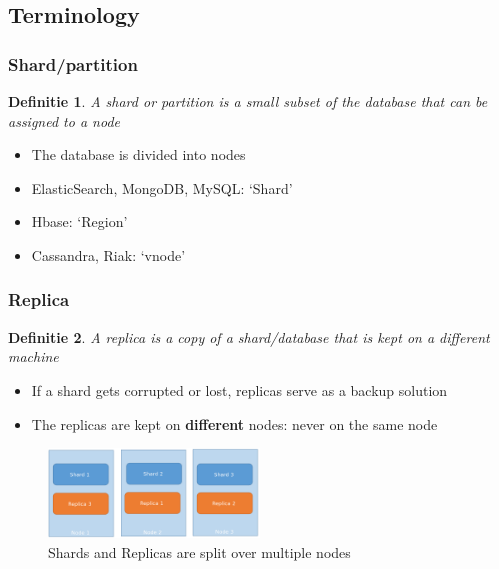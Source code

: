 \documentclass{article}
\newtheorem{theorem}{Definitie}[section]
\begin{document}
\subsection{Terminology}

\subsubsection{Shard/partition}

\begin{theorem}
    A shard or partition is a small subset of the database that can be assigned to a node
\end{theorem}

\begin{itemize}
    \item The database is divided into nodes
    \item ElasticSearch, MongoDB, MySQL: `Shard'
    \item Hbase: `Region'
    \item Cassandra, Riak: `vnode'
\end{itemize}

\subsubsection{Replica}

\begin{theorem}
    A replica is a copy of a shard/database that is kept on a different machine
\end{theorem}

\begin{itemize}
    \item If a shard gets corrupted or lost, replicas serve as a backup solution
    \item The replicas are kept on \textbf{different} nodes: never on the same node
\end{itemize}

\begin{figure}[H]
    \centering
    \includegraphics[width=0.5\textwidth]{partitions-replicas-nodes.png}
    \caption{Shards and Replicas are split over multiple nodes}
\end{figure}
\end{document}
